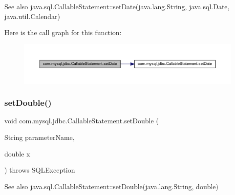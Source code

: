 \begin{DoxySeeAlso}{See also}
java.\+sql.\+Callable\+Statement\+::set\+Date(java.\+lang.\+String, java.\+sql.\+Date, java.\+util.\+Calendar) 
\end{DoxySeeAlso}
Here is the call graph for this function\+:\nopagebreak
\begin{figure}[H]
\begin{center}
\leavevmode
\includegraphics[width=350pt]{classcom_1_1mysql_1_1jdbc_1_1_callable_statement_a18837a9d186c198eebc30d04fa684679_cgraph}
\end{center}
\end{figure}
\mbox{\label{classcom_1_1mysql_1_1jdbc_1_1_callable_statement_a44970f6ec5b18becfcedeaae3160a079}} 
\subsubsection{\texorpdfstring{set\+Double()}{setDouble()}}
{\footnotesize\ttfamily void com.\+mysql.\+jdbc.\+Callable\+Statement.\+set\+Double (\begin{DoxyParamCaption}\item[{String}]{parameter\+Name,  }\item[{double}]{x }\end{DoxyParamCaption}) throws S\+Q\+L\+Exception}

\begin{DoxySeeAlso}{See also}
java.\+sql.\+Callable\+Statement\+::set\+Double(java.\+lang.\+String, double) 
\end{DoxySeeAlso}
\mbox{\label{classcom_1_1mysql_1_1jdbc_1_1_callable_statement_afa45648b124eb9be9e9ff9442e37c090}} 
